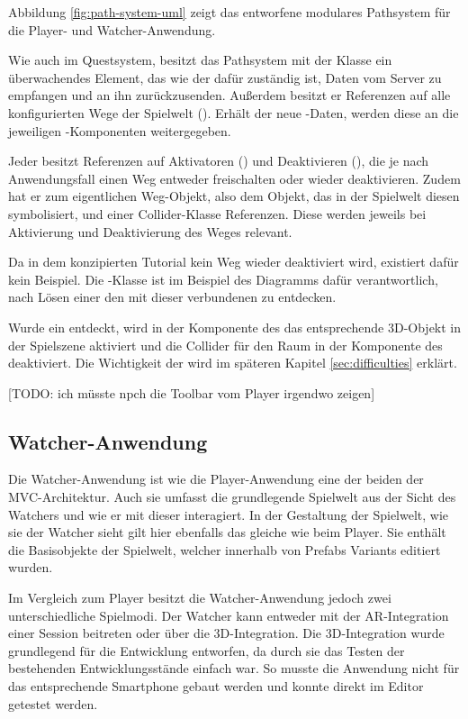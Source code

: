 Abbildung \ref{fig:path-system-uml} zeigt das entworfene modulares Pathsystem für die Player- und Watcher-Anwendung.

Wie auch im Questsystem, besitzt das Pathsystem mit der Klasse  ein überwachendes Element, das wie der  dafür zuständig ist, Daten vom Server zu empfangen und an ihn zurückzusenden. Außerdem besitzt er Referenzen auf alle konfigurierten Wege der Spielwelt (). Erhält der  neue -Daten, werden diese an die jeweiligen -Komponenten weitergegeben.

Jeder  besitzt Referenzen auf Aktivatoren () und Deaktivieren (), die je nach Anwendungsfall einen Weg entweder freischalten oder wieder deaktivieren. Zudem hat er zum eigentlichen Weg-Objekt, also dem Objekt, das in der Spielwelt diesen  symbolisiert, und einer Collider-Klasse Referenzen. Diese werden jeweils bei Aktivierung und Deaktivierung des Weges relevant.

Da in dem konzipierten Tutorial kein Weg wieder deaktiviert wird, existiert dafür kein Beispiel. Die -Klasse ist im Beispiel des Diagramms dafür verantwortlich, nach Lösen einer  den mit dieser  verbundenen  zu entdecken.

Wurde ein  entdeckt, wird in der Komponente des  das entsprechende \ac{3D}-Objekt in der Spielszene aktiviert und die Collider für den Raum in der Komponente des  deaktiviert. Die Wichtigkeit der  wird im späteren Kapitel \ref{sec:difficulties} erklärt. 

[TODO: ich müsste npch die Toolbar vom Player irgendwo zeigen]

\subsection{Watcher-Anwendung}
Die Watcher-Anwendung ist wie die Player-Anwendung eine der beiden  der \ac{MVC}-Architektur. Auch sie umfasst die grundlegende Spielwelt aus der Sicht des Watchers und wie er mit dieser interagiert. In der Gestaltung der Spielwelt, wie sie der Watcher sieht gilt hier ebenfalls das gleiche wie beim Player. Sie enthält die Basisobjekte der Spielwelt, welcher innerhalb von Prefabs Variants editiert wurden.

Im Vergleich zum Player besitzt die Watcher-Anwendung jedoch zwei unterschiedliche Spielmodi. Der Watcher kann entweder mit der \ac{AR}-Integration einer Session beitreten oder über die \ac{3D}-Integration. Die \ac{3D}-Integration wurde grundlegend für die Entwicklung entworfen, da durch sie das Testen der bestehenden Entwicklungsstände einfach war. So musste die Anwendung nicht für das entsprechende Smartphone gebaut werden und konnte direkt im Editor getestet werden.


